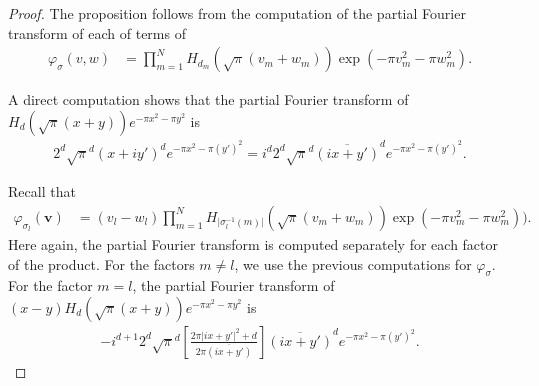 \documentclass[a4paper,11pt]{amsart} %
\newcommand{\8}{\infty}
\newcommand{\vbf}{\mathbf{v}}
\newcommand{\four}{\pazocal{F}}
\newcommand{\R}{\mathbb{R}}
\theoremstyle{mytheoremstyle}
\theoremstyle{remark}
\numberwithin{equation}{section}
\begin{document}
\begin{proof}  
The proposition follows from the computation of the partial Fourier transform of each of terms of
    \begin{align} \label{prod1}  \varphi_\sigma(v,w) %
    & =\prod_{m=1}^NH_{d_m}\left (\sqrt{\pi}(v_m+w_m) \right )\exp\left (-\pi v_m^2-\pi w_m^2 \right ).
\end{align}

A direct computation shows that the partial Fourier transform of $H_d(\sqrt{\pi}(x+y))e^{-\pi x^2-\pi y^2}$ is
\begin{align}
2^d \sqrt{\pi}^d(x+iy')^de^{-\pi x^2-\pi(y')^2}=i^d2^d \sqrt{\pi}^d\overline{(ix+y')}^de^{-\pi x^2-\pi(y')^2}.
\end{align} 

Recall that 
\begin{align}
\varphi_{\sigma_l}(\vbf) %
& = (v_l-w_l) \prod_{m=1}^N H_{\vert \sigma_l^{-1}(m) \vert}(\sqrt{\pi}(v_m+w_m))\exp\left (-\pi v_m^2-\pi w_m^2 \right ) 
).
\end{align} Here again, the partial Fourier transform is computed separately for each factor of the product. For  the factors $m\neq l$, we use the previous computations for $\varphi_\sigma$. For the factor $m=l$, the partial Fourier transform of $(x-y)H_d(\sqrt{\pi}(x+y))e^{-\pi x^2-\pi y^2}$ is
\begin{align} \label{fourier transform equality}
-i^{d+1}2^d \sqrt{\pi}^d \left [ \frac{2\pi \vert ix+y' \vert ^2+d}{2\pi\overline{(ix+y')}}\right ]\overline{(ix+y')}^de^{-\pi x^2-\pi(y')^2}.
\end{align}



\end{proof}
\end{document}
